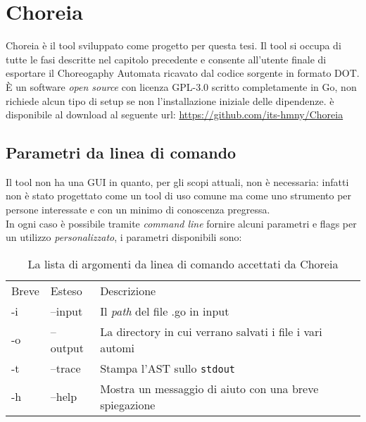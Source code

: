 \chapter{Choreia}
Choreia è il tool sviluppato come progetto per questa tesi. Il tool si occupa di tutte le fasi descritte nel capitolo precedente e consente all'utente finale di esportare il Choreogaphy Automata ricavato dal codice sorgente in formato DOT. È un software \emph{open source} con licenza GPL-3.0 scritto completamente in Go, non richiede alcun tipo di setup se non l'installazione iniziale delle dipendenze. è disponibile al download al seguente url: \url{https://github.com/its-hmny/Choreia}\\

\section{Parametri da linea di comando}
Il tool non ha una GUI in quanto, per gli scopi attuali, non è necessaria: infatti non è stato progettato come un tool di uso comune ma come uno strumento per persone interessate e con un minimo di conoscenza pregressa.\\
In ogni caso è possibile tramite \emph{command line} fornire alcuni parametri e flags per un utilizzo \emph{personalizzato}, i parametri disponibili sono:
\begin{table}[h!]
    \centering
    \begin{tabular}{l l l}
        Breve & Esteso   & Descrizione                                              \\
        -i    & --input  & Il \emph{path} del file .go in input                     \\
        -o    & --output & La directory in cui verrano salvati i file i vari automi \\
        -t    & --trace  & Stampa l'AST sullo \texttt{stdout}                       \\
        -h    & --help   & Mostra un messaggio di aiuto con una breve spiegazione   \\
    \end{tabular}
    \caption{La lista di argomenti da linea di comando  accettati da Choreia}
\end{table}

